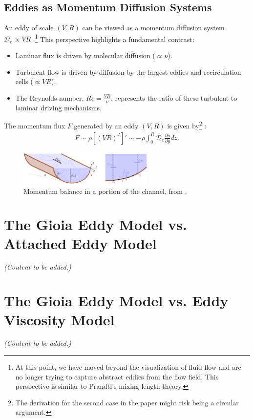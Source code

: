 \documentclass[10pt]{article}
\begin{document}
\subsection{Eddies as Momentum Diffusion Systems}
An eddy of scale $(V, R)$ can be viewed as a momentum diffusion system $\mathcal{D}_e \propto VR$ \cite{ocfjfm2024}.\footnote{At this point, we have moved beyond the visualization of fluid flow and are no longer trying to capture abstract eddies from the flow field. This perspective is similar to Prandtl's mixing length theory.} This perspective highlights a fundamental contrast:
\begin{itemize}
    \item Laminar flux is driven by molecular diffusion ($\propto \nu$).
    \item Turbulent flow is driven by diffusion by the largest eddies and recirculation cells ($\propto VR$).
    \item The Reynolds number, $Re = \frac{VR}{\nu}$, represents the ratio of these turbulent to laminar driving mechanisms.
\end{itemize}
The momentum flux $F$ generated by an eddy $(V, R)$ is given by\footnote{The derivation for the second case in the paper might risk being a circular argument.} \cite{ocfjfm2024}:
\begin{align*}
    F \sim \rho \left[ (VR)^2 \right] '\sim -\rho \int_0^{R}  \mathcal{D}_e \frac{\partial u}{\partial y} dz
.\end{align*}

\begin{figure}[ht!]
    \centering
    \includegraphics[width=0.6\textwidth]{./figures/momentum-flux.png}
    \caption{Momentum balance in a portion of the channel, from \cite{ocfjfm2024}.}
    \label{fig:-figures-momentum-flux-png}
\end{figure}

\section{The Gioia Eddy Model vs. Attached Eddy Model}
\textit{(Content to be added.)}

\section{The Gioia Eddy Model vs. Eddy Viscosity Model}
\textit{(Content to be added.)}
\end{document}
